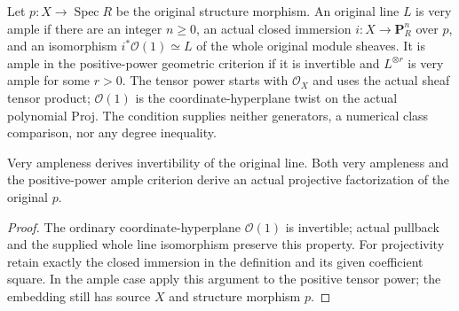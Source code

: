 \begin{definition}
\label{def:fc-original-geometric-line-ampleness}
\leanok
{}
Let $p:X\to\operatorname{Spec}R$ be the original structure morphism.
An original line $L$ is very ample if there are an integer $n\geq0$, an
actual closed immersion $i:X\to\mathbf P_R^n$ over $p$, and an isomorphism
$i^*\mathcal O(1)\simeq L$ of the whole original module sheaves.
It is ample in the positive-power geometric criterion if it is invertible
and $L^{\otimes r}$ is very ample for some $r>0$.
The tensor power starts with $\mathcal O_X$ and uses the actual sheaf tensor
product; $\mathcal O(1)$ is the coordinate-hyperplane twist on the actual
polynomial Proj.  The condition supplies neither generators, a numerical
class comparison, nor any degree inequality.
\end{definition}

\begin{lemma}
\label{lem:fc-geometric-ampleness-projectivity}
\leanok
{}
Very ampleness derives invertibility of the original line.  Both very
ampleness and the positive-power ample criterion derive an actual projective
factorization of the original $p$.
\end{lemma}
\begin{proof}
The ordinary coordinate-hyperplane $\mathcal O(1)$ is invertible; actual
pullback and the supplied whole line isomorphism preserve this property.
For projectivity retain exactly the closed immersion in the definition and
its given coefficient square.  In the ample case apply this argument to
the positive tensor power; the embedding still has source $X$ and
structure morphism $p$.
\end{proof}
